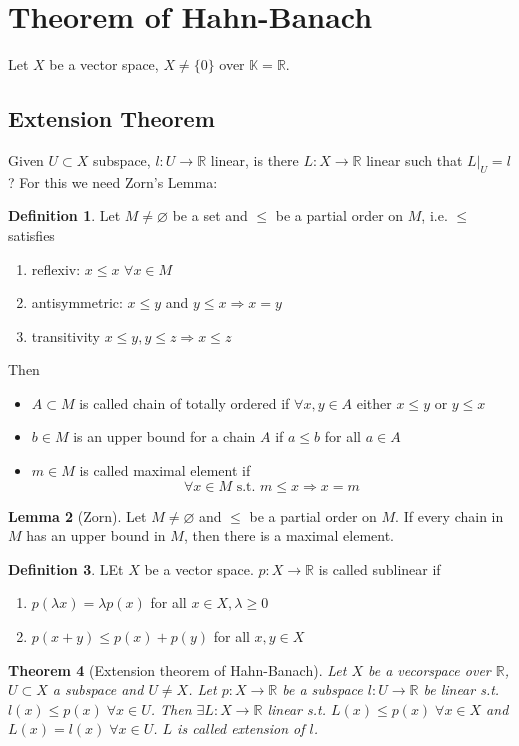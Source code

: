 \documentclass[a4paper, 12pt]{article}
\theoremstyle{plain}
\newtheorem{theorem}{Theorem}[subsection] %
\theoremstyle{definition}
\newtheorem{definition}[theorem]{Definition} %
\theoremstyle{lemma}
\newtheorem{lemma}[theorem]{Lemma}
\theoremstyle{remark}
\theoremstyle{corollary}
\theoremstyle{example}
\begin{document}
	\section{Theorem of Hahn-Banach}
	Let $X$ be a vector space, $X \neq \{0\}$ over $\mathbb{K} = \mathbb{R}$.
	\subsection{Extension Theorem}
	Given $U\subset X$ subspace, $l: U \to \mathbb{R}$ linear, is there $L: X \to \mathbb{R}$ linear such that $L|_U = l$? For this we need Zorn's Lemma:
	\begin{definition}
		Let $M\neq \varnothing$ be a set and $\leq$ be a partial order on $M$, i.e. $\leq$ satisfies
		\begin{enumerate}
			\item reflexiv: $x \leq x$ $\forall x \in M$
			\item antisymmetric: $x \leq y$ and $y \leq x \Rightarrow x = y$
			\item transitivity $x \leq y, y \leq z \Rightarrow x \leq z$
		\end{enumerate}
		Then
		\begin{itemize}
			\item $A \subset M$ is called chain of totally ordered if $\forall x,y \in A$ either $x \leq y$ or $y \leq x$
			\item $b \in M$ is an upper bound for a chain $A$ if $a \leq b$ for all $a \in A$
			\item $m \in M$ is called maximal element if \[\forall x \in M \text{ s.t. } m \leq x \Rightarrow x = m\]
		\end{itemize}
	\end{definition}
	\begin{lemma} [Zorn]
		Let $M\neq \varnothing$ and $\leq$ be a partial order on $M$. If every chain in $M$ has an upper bound in $M$, then there is a maximal element.
	\end{lemma}
	\begin{definition}
		LEt $X$ be a vector space. $p: X \to \mathbb{R}$ is called sublinear if \begin{enumerate}
			\item $p(\lambda x) = \lambda p(x)$ for all $x \in X, \lambda \geq 0$
			\item $p(x+y) \leq p(x)+p(y)$ for all $x,y \in X$
		\end{enumerate}
	\end{definition}
	\begin{theorem}[Extension theorem of Hahn-Banach]
		Let $X$ be a vecorspace over $\mathbb{R}$, $U\subset X$ a subspace and $U\neq X$. Let $p:X \to \mathbb{R}$ be a subspace $l: U \to \mathbb{R}$ be linear s.t. $l(x) \leq p(x) \; \forall x \in U$. Then $\exists L:X \to \mathbb{R}$ linear s.t. $L(x) \leq p(x) \; \forall x \in X$ and $L(x) = l(x) \; \forall x \in U$. $L$ is called extension of $l$.
	\end{theorem}
\end{document}
